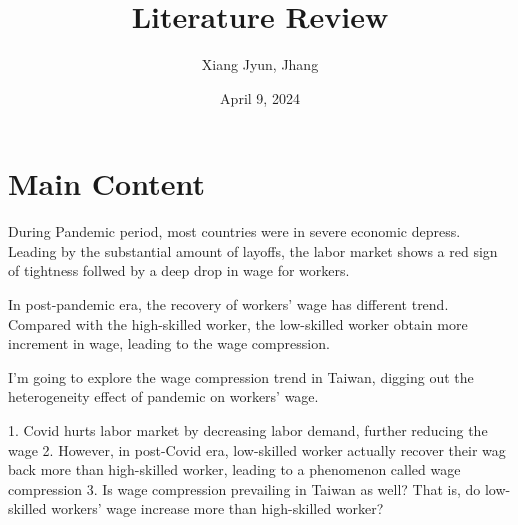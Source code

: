 \documentclass{article}
\title{Literature Review}
\author{Xiang Jyun, Jhang}
\date{April 9, 2024}
\begin{document}
\maketitle

\section{Main Content}

    During Pandemic period, most countries were in severe economic depress. Leading by the substantial amount of layoffs, the labor market shows a red sign of tightness follwed by a deep drop in wage for workers.

    In post-pandemic era, the recovery of workers' wage has different trend. Compared with the high-skilled worker, the low-skilled worker obtain more increment in wage, leading to the wage compression.

    I'm going to explore the wage compression trend in Taiwan, digging out the heterogeneity effect of pandemic on workers' wage.  
    

    1. Covid hurts labor market by decreasing labor demand, further reducing the wage
    2. However, in post-Covid era, low-skilled worker actually recover their wag back more than high-skilled worker, leading to a phenomenon called wage compression
    3. Is wage compression prevailing in Taiwan as well? That is, do low-skilled workers' wage increase more than high-skilled worker?


    
\medskip



\printbibliography
\end{document}
